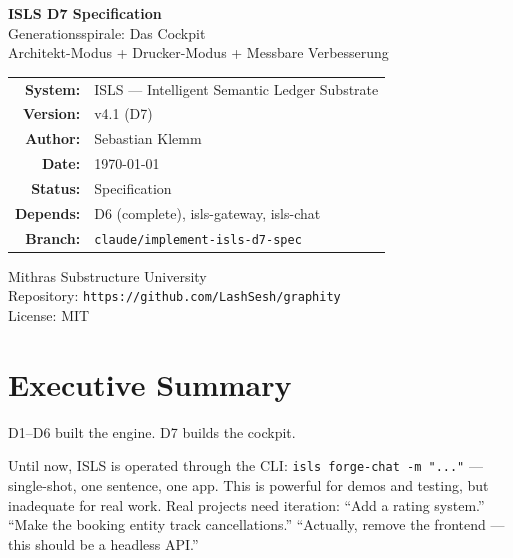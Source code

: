 \documentclass[11pt,a4paper]{article}
\begin{document}
\begin{titlepage}
\centering
\vspace*{2.5cm}

{\Huge\bfseries\color{isls-blue} ISLS D7 Specification}\\[0.5cm]
{\LARGE\color{isls-orange} Generationsspirale: Das Cockpit}\\[0.3cm]
{\large\color{isls-gray} Architekt-Modus + Drucker-Modus + Messbare Verbesserung}\\[2cm]

{\large
\begin{tabular}{rl}
\textbf{System:}    & ISLS --- Intelligent Semantic Ledger Substrate \\
\textbf{Version:}   & v4.1 (D7) \\
\textbf{Author:}    & Sebastian Klemm \\
\textbf{Date:}      & \today \\
\textbf{Status:}    & Specification \\
\textbf{Depends:}   & D6 (complete), isls-gateway, isls-chat \\
\textbf{Branch:}    & \texttt{claude/implement-isls-d7-spec} \\
\end{tabular}
}

\vfill

{\small\color{isls-gray}
Mithras Substructure University\\
Repository: \texttt{https://github.com/LashSesh/graphity}\\
License: MIT
}
\end{titlepage}

\tableofcontents
\newpage


\section{Executive Summary}

D1--D6 built the engine. D7 builds the cockpit.

Until now, ISLS is operated through the CLI: \texttt{isls forge-chat 
-m "..."} --- single-shot, one sentence, one app. This is powerful 
for demos and testing, but inadequate for real work. Real projects 
need iteration: ``Add a rating system.'' ``Make the booking entity 
track cancellations.'' ``Actually, remove the frontend --- this should 
be a headless API.''
\end{document}
